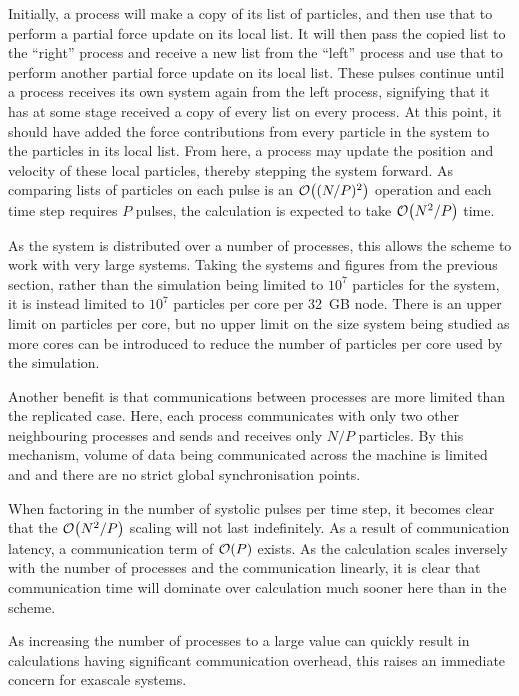 Initially, a process will make a copy of its list of particles,
and then use that to perform a partial force update on its local list.
%
It will then pass the copied list to the ``right'' process and
receive a new list from the ``left'' process and use that to perform
another partial force update on its local list.
%
These pulses continue until a process receives its own system again from
the left process, signifying that it has at some stage received
a copy of every list on every process.
%
At this point, it should have added the force contributions from
every particle in the system to the particles in its local list.
%
From here, a process may update the position and velocity of these local
particles, thereby stepping the system forward.
%
As comparing lists of particles on each pulse is an $\mathcal{O}{\left({ (N/P)^2 }\right)}$ operation
and each time step requires $P$ pulses, the calculation is expected to take
$\mathcal{O}{\left({ N^2/P }\right)}$ time.


%
As the system is distributed over a number of processes, this allows
the scheme to work with very large systems.
%
Taking the systems and figures from the previous section,
rather than the simulation being limited to $10^7$ particles for the system,
it is instead limited to $10^7$ particles per core per 32~GB node.
%
There is an upper limit on particles per core, but no
upper limit on the size system being studied as more cores can be introduced
to reduce the number of particles per core used by the simulation.

Another benefit is that
communications between processes are more limited than
the replicated case.
%
Here, each process communicates with only two other neighbouring processes
and sends and receives only $N/P$ particles.
%
By this mechanism, volume of data
being communicated across the machine is limited
and and there are no strict global synchronisation points.

When factoring in the number of systolic pulses per time step,
it becomes clear that the $\mathcal{O}{\left({ N^2/P }\right)}$ scaling will not last indefinitely.
%
As a result of communication latency, a communication term of
$\mathcal{O}{\left({ P }\right)}$ exists.
%
As the calculation scales inversely with the number of processes
and the communication linearly, it is clear that communication time will
dominate over calculation much sooner here than
in the \replicateddata{} scheme.

%
As increasing the number of processes to a large value
can quickly result in calculations having significant communication overhead,
this raises an immediate concern for exascale systems.
